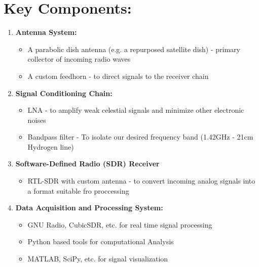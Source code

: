 \documentclass[12pt]{report}
\begin{document}
\section*{Key Components: }
\begin{enumerate}
    \item \textbf{Antenna System:} 
    \begin{itemize}
        \item A parabolic dish antenna (e.g. a repurposed satellite dish) - primary collector of incoming radio waves
        \item A custom feedhorn - to direct signals to the receiver chain
    \end{itemize}
    \item \textbf{Signal Conditioning Chain:} 
    \begin{itemize}
        \item LNA - to amplify weak celestial signals and minimize other electronic noises
        \item Bandpass filter - To isolate our desired frequency band (1.42GHz - 21cm Hydrogen line)
    \end{itemize}
    \item \textbf{Software-Defined Radio (SDR) Receiver}
    \begin{itemize}
        \item RTL-SDR with custom antenna - to convert incoming analog signals into a format suitable fro proccessing
    \end{itemize}
    \item \textbf{Data Acquisition and Processing System:}
    \begin{itemize}
        \item GNU Radio, CubicSDR, etc. for real time signal processing
        \item Python based tools for computational Analysis
        \item MATLAB, SciPy, etc. for signal visualization
    \end{itemize}
\end{enumerate}
\end{document}
